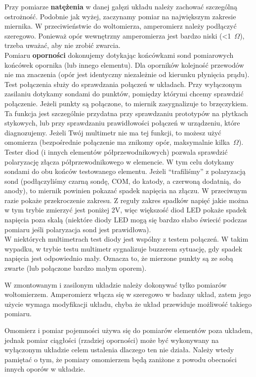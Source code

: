 \documentclass{pdfBooklets}
\begin{document}
Przy pomiarze \textbf{natężenia} w danej gałęzi układu należy zachować szczególną ostrożność. Podobnie jak wyżej, zaczynamy pomiar na największym
zakresie miernika. W przeciwieństwie do woltomierza, amperomierz należy podłączyć szeregowo. Ponieważ opór wewnętrzny amperomierza jest bardzo
niski (<1~$\Omega$), trzeba uważać, aby nie zrobić zwarcia.
\\

Pomiaru \textbf{oporności} dokonujemy dotykając końcówkami sond pomiarowych końcówek opornika (lub innego elementu). Dla oporników kolejność przewodów nie ma znaczenia
(opór jest identyczny niezależnie od kierunku płynięcia prądu).
\\

Test połączenia służy do sprawdzania połączeń w układach. Przy wyłączonym zasilaniu dotykamy sondami do punktów, pomiędzy którymi chcemy
sprawdzić połączenie. Jeżeli punkty są połączone, to miernik zasygnalizuje to brzęczykiem. Ta funkcja jest szczególnie przydatna przy sprawdzaniu
prototypów na płytkach stykowych, lub przy sprawdzaniu prawidłowości połączeń w urządzeniu, które diagnozujemy. Jeżeli Twój
multimetr nie ma tej funkcji, to możesz użyć omomierza (bezpośrednie połączenie ma znikomy opór, maksymalnie kilka~$\Omega$).
\\

Tester diod (i innych elementów półprzewodnikowych) pozwala sprawdzić polaryzację złącza półprzewodnikowego w elemencie. W tym celu dotykamy
sondami do obu końców testowanego elementu. Jeżeli ``trafiliśmy'' z polaryzacją sond (podłączyliśmy czarną sondę, COM, do katody, a czerwoną
dodatnią, do anody), to miernik powinien pokazać spadek napięcia na złączu.
W przeciwnym razie pokaże przekroczenie zakresu. Z reguły zakres spadków napięć jakie można w tym trybie zmierzyć jest poniżej 2V, więc
większość diod LED pokaże spadek napięcia poza skalą (niektóre diody LED mogą się bardzo słabo świecić podczas pomiaru jeśli polaryzacja
sond jest prawidłowa).
\\

W niektórych multimetrach test diody jest wspólny z testem połączeń. W takim wypadku, w trybie testu multimetr sygnalizuje
buzzerem sytuację, gdy spadek napięcia jest odpowiednio mały. Oznacza to, że mierzone punkty są ze sobą zwarte
(lub połączone bardzo małym oporem).\\

\begin{ProTip}{}
  W zmontowanym i zasilonym układzie należy dokonywać tylko pomiarów woltomierzem.
  Amperomierz włącza się w szeregowo w badany układ, zatem jego użycie wymaga modyfikacji układu, chyba że układ przewiduje możliwość takiego pomiaru.
  
  Omomierz i pomiar pojemności używa się do pomiarów elementów poza układem,
  jednak pomiar ciągłości (rzadziej oporności) może być wykonywany na wyłączonym układzie celem ustalenia dlaczego ten nie działa.
  Należy wtedy pamiętać o tym, że pomiary omomierzem będą zaniżone z  powodu obecności innych oporów w układzie.
\end{ProTip}
\end{document}
